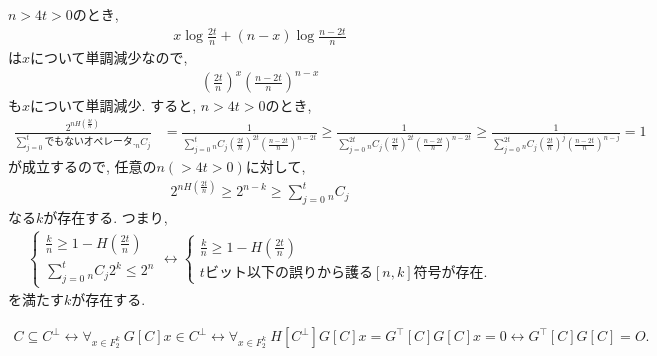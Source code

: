 \begin{ex}
    \label{ex10.23}
    $ n > 4t > 0 $のとき,
    \begin{align*}
        x \log \frac{2t}{n} + \left( n - x \right) \log \frac{ n - 2t}{n}
    \end{align*}
    は$x$について単調減少なので,
    \begin{align*}
        \left( \frac{2t}{n}\right)^{x} \left( \frac{ n - 2t}{n}\right)^{n - x}
    \end{align*}
    も$x$について単調減少. すると,  $ n > 4t > 0 $のとき,
    \begin{align*}
        \frac{2^{n H\left(\frac{2t}{n}\right)}}{\sum_{j=0}^t {でもない}オペレータ._n C_j}
         & =
        \frac{1}{\sum_{j=0}^t {}_n C_j \left( \frac{2t}{n}\right)^{2t} \left(\frac{n-2t}{n} \right)^{n-2t}}
        \geq
        \frac{1}{\sum_{j=0}^{2t} {}_n C_j \left( \frac{2t}{n}\right)^{2t} \left(\frac{n-2t}{n} \right)^{n-2t}}
        \geq
        \frac{1}{\sum_{j=0}^{2t} {}_n C_j \left( \frac{2t}{n}\right)^{j} \left(\frac{n-2t}{n} \right)^{n-j}}= 1
    \end{align*}
    が成立するので, 任意の$n (>4t > 0)$に対して,
    \begin{align*}
        2^{n H\left(\frac{2t}{n}\right)} \ge 2^{n-k} \ge \sum_{j=0}^t {}_n C_j
    \end{align*}
    なる$k$が存在する.
    つまり,
    \begin{align*}
        \begin{cases}
            \frac{k}{n} \ge 1 - H \left( \frac{2t}{n}\right) \\
            \sum_{j=0}^t {}_n C_j 2^k \le 2^n
        \end{cases}
        \longleftrightarrow
        \begin{cases}
            \frac{k}{n} \ge 1 - H \left( \frac{2t}{n}\right) \\
            t ビット以下の誤りから護る[n,k]符号が存在.
        \end{cases}
    \end{align*}
    を満たす$k$が存在する.
\end{ex}

\begin{ex}
    \label{ex10.24}
    \begin{align*}
        C \subseteq C^\perp
        \longleftrightarrow
        \forall_{x \in F_2^k} \ G[C]x \in C^\perp
        \longleftrightarrow
        \forall_{x \in F_2^k} \ H[C^\perp]G[C] x =  G^\top[C]G[C] x = 0
        \longleftrightarrow
        G^\top[C]G[C] = O.
    \end{align*}
\end{ex}

